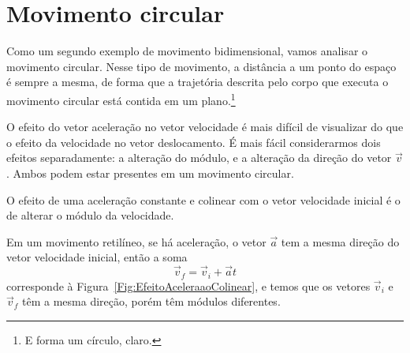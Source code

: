 \section{Movimento circular}
\label{Sec:MovimentoCircular}

Como um segundo exemplo de movimento bidimensional, vamos analisar o movimento circular. Nesse tipo de movimento, a distância a um ponto do espaço é sempre a mesma, de forma que a trajetória descrita pelo corpo que executa o movimento circular está contida em um plano.\footnote[][-2cm]{E forma um círculo, claro.}

O efeito do vetor aceleração no vetor velocidade é mais difícil de visualizar do que o efeito da velocidade no vetor deslocamento. É mais fácil considerarmos dois efeitos separadamente: a alteração do módulo, e a alteração da direção do vetor $\vec{v}$. Ambos podem estar presentes em um movimento circular.

\begin{marginfigure}[-4cm]
\centering
{}
\caption{O efeito de uma aceleração constante e colinear com o vetor velocidade inicial é o de alterar o módulo da velocidade.\label{Fig:EfeitoAceleraaoColinear}}
\end{marginfigure}

Em um movimento retilíneo, se há aceleração, o vetor $\vec{a}$ tem a mesma direção do vetor velocidade inicial, então a soma
\begin{equation}
    \vec{v}_f = \vec{v}_i + \vec{a} t
\end{equation}
%
corresponde à Figura~\ref{Fig:EfeitoAceleraaoColinear}, e temos que os vetores $\vec{v}_i$ e $\vec{v}_f$ têm a mesma direção, porém têm módulos diferentes.

